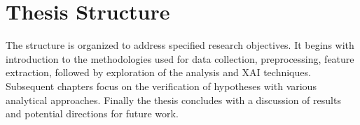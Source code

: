 
\section{Thesis Structure}
\label{sec:thesisstructure}

The structure is organized to address specified research objectives. It begins
with introduction to the methodologies used for data collection, preprocessing,
feature extraction, followed by exploration of the analysis and XAI techniques.
Subsequent chapters focus on the verification of hypotheses with various
analytical approaches. Finally the thesis concludes with a discussion of
results and potential directions for future work.

